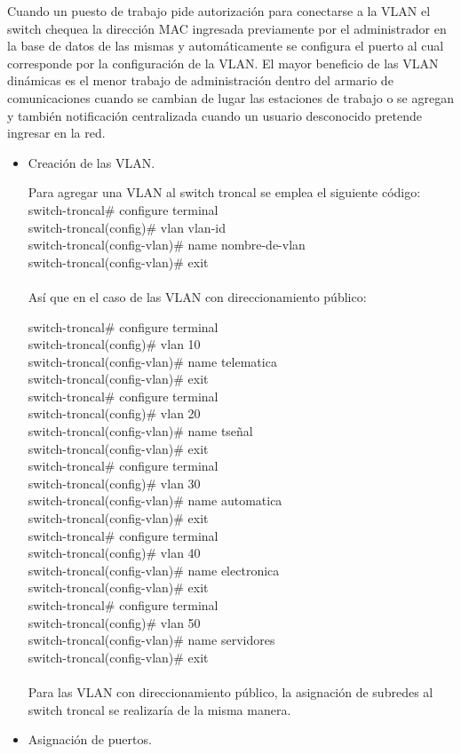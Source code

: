 \documentclass[a4paper,10pt]{article}
\begin{document}
Cuando un puesto de trabajo pide autorización para conectarse a la VLAN el switch chequea la dirección MAC ingresada previamente por el administrador en la base de datos de las mismas y automáticamente se configura el puerto al cual corresponde por la configuración de la VLAN. 
El mayor beneficio de las VLAN dinámicas es el menor trabajo de administración dentro del armario de comunicaciones cuando se cambian de lugar las estaciones de trabajo o se agregan y también notificación centralizada cuando un usuario desconocido pretende ingresar en la red.
\begin{itemize}
\item Creaci\'on de las VLAN.

Para agregar una VLAN al switch troncal se emplea el siguiente código:
\textsf{switch-troncal\# configure terminal\\
switch-troncal(config)\# vlan vlan-id\\
switch-troncal(config-vlan)\# name nombre-de-vlan\\
switch-troncal(config-vlan)\# exit}\\ \\
Así que en el caso de las VLAN con direccionamiento público:

\textsf{switch-troncal\# configure terminal\\
switch-troncal(config)\# vlan 10\\
switch-troncal(config-vlan)\# name telematica\\
switch-troncal(config-vlan)\# exit\\
switch-troncal\# configure terminal\\
switch-troncal(config)\# vlan 20\\
switch-troncal(config-vlan)\# name tseñal\\
switch-troncal(config-vlan)\# exit\\
switch-troncal\# configure terminal\\
switch-troncal(config)\# vlan 30\\
switch-troncal(config-vlan)\# name automatica\\
switch-troncal(config-vlan)\# exit\\
switch-troncal\# configure terminal\\
switch-troncal(config)\# vlan 40\\
switch-troncal(config-vlan)\# name electronica\\
switch-troncal(config-vlan)\# exit\\
switch-troncal\# configure terminal\\
switch-troncal(config)\# vlan 50\\
switch-troncal(config-vlan)\# name servidores\\
switch-troncal(config-vlan)\# exit}\\ \\
Para las VLAN con direccionamiento público, la asignación de subredes al switch troncal se realizaría de la misma manera.
\item Asignaci\'on de puertos.


\end{itemize}
\end{document}
